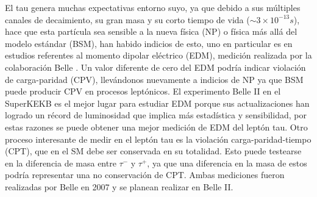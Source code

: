 El tau genera muchas expectativas entorno suyo, ya que debido a sus múltiples canales de decaimiento, su gran masa y su corto tiempo de vida (\(\sim3\times10^{-13}s\)), hace que esta partícula sea sensible a la nueva física (NP) o física más allá del modelo estándar (BSM), han habido indicios de esto, uno en particular es en estudios referentes al momento dipolar eléctrico (EDM), medición realizada por la colaboración Belle \cite{Inami_2003}. Un valor diferente de cero del EDM podría indicar violación de carga-paridad (CPV), llevándonos nuevamente a indicios de NP ya que BSM puede producir CPV en procesos leptónicos. El experimento Belle II en el SuperKEKB es el mejor lugar para estudiar EDM porque sus actualizaciones han logrado un récord de luminosidad que implica más estadística y sensibilidad, por estas razones se puede obtener una mejor medición de EDM del leptón tau. 
Otro proceso interesante de medir en el leptón tau es la violación carga-paridad-tiempo (CPT), que en el SM debe ser conservada en su totalidad. Esto puede testearse en la diferencia de masa entre \(\tau^-\) y \(\tau^+\), ya que una diferencia en la masa de estos podría representar una no conservación de CPT. Ambas mediciones fueron realizadas por Belle \cite{PhysRevLett.99.011801} en 2007 y se planean realizar en Belle II. 